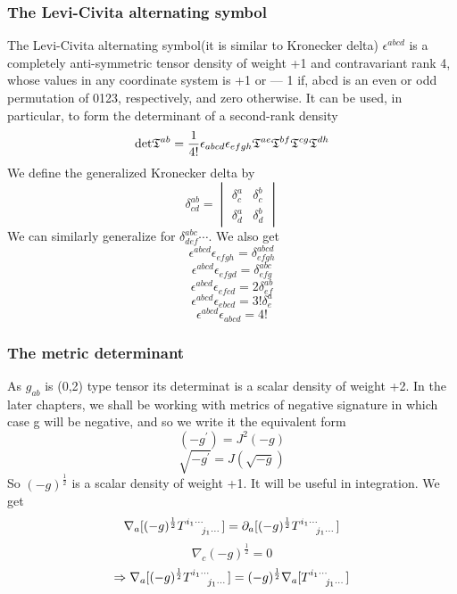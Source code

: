 \documentclass[12pt,a4paper]{article}
\numberwithin{table}{section}
\numberwithin{figure}{section}
\numberwithin{equation}{section}
\theoremstyle{remark}
\theoremstyle{definition}
\begin{document}
\subsubsection*{The Levi-Civita alternating symbol}
The Levi-Civita alternating symbol(it is similar to Kronecker delta) $\epsilon^{abcd}$  is a completely anti-symmetric tensor density of weight +1 and contravariant rank 4, whose values in any coordinate system is +1 or — 1 if, abcd is an even or odd permutation of 0123, respectively, and zero otherwise.
It can be used, in particular, to form the determinant of a second-rank density
$$\text{det}\tensor{\mathfrak{T}}{^{ab}}=\frac{1}{4!}\epsilon_{abcd}\epsilon_{efgh}\tensor{\mathfrak{T}}{^{ae}}\tensor{\mathfrak{T}}{^{bf}}\tensor{\mathfrak{T}}{^{cg}}\tensor{\mathfrak{T}}{^{dh}} $$
We define the generalized Kronecker delta by 
$$\delta^{ab}_{cd} =\begin{vmatrix}
\delta^a_c & \delta^b_c \\
\delta^a_d  & \delta^b_d
\end{vmatrix}
$$
We can similarly generalize for $\delta^{abc}_{def}\cdots$. We also get
$$\epsilon^{abcd}\epsilon_{efgh}=\delta^{abcd}_{efgh}$$
$$\epsilon^{abcd}\epsilon_{efgd}=\delta^{abc}_{efg}$$
$$\epsilon^{abcd}\epsilon_{efcd}=2\delta^{ab}_{ef}$$
$$\epsilon^{abcd}\epsilon_{ebcd}=3!\delta^{a}_{e}$$
$$\epsilon^{abcd}\epsilon_{abcd}=4!$$
\subsubsection*{The metric determinant }
As $g_{ab}$ is (0,2) type tensor its determinat is a scalar density of weight +2. In the later chapters, we shall be working with metrics of negative signature in which case g will be negative, and so we write it the equivalent form
$$(-g^{'})=J^2(-g) $$
$$\sqrt{-g^{'}}=J(\sqrt{-g})$$
So $(-g)^{\frac{1}{2}}$ is a scalar density of weight +1. It will be useful in integration. We get
$$\nabla_a[(-g)^{\frac{1}{2}}\tensor{T}{^{i_1\cdots}_{j_1\cdots}}]=\partial_a[(-g)^{\frac{1}{2}}\tensor{T}{^{i_1\cdots}_{j_1\cdots}}]$$
$$\nabla_c(-g)^{\frac{1}{2}}=0 $$
$$\Rightarrow\nabla_a[(-g)^{\frac{1}{2}}\tensor{T}{^{i_1\cdots}_{j_1\cdots}}]=(-g)^{\frac{1}{2}}\nabla_a[\tensor{T}{^{i_1\cdots}_{j_1\cdots}}]$$
\end{document}
